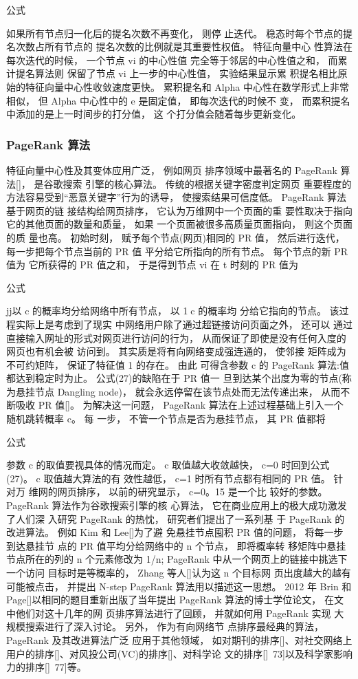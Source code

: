 				公式

				如果所有节点归一化后的提名次数不再变化， 则停 止迭代。 稳态时每个节点的提名次数占所有节点的 提名次数的比例就是其重要性权值。 特征向量中心 性算法在每次迭代的时候， 一个节点 vi 的中心性值 完全等于邻居的中心性值之和， 而累计提名算法则 保留了节点 vi 上一步的中心性值， 实验结果显示累 积提名相比原始的特征向量中心性收敛速度更快。 累积提名和 Alpha 中心性在数学形式上非常相似， 但 Alpha 中心性中的 e 是固定值， 即每次迭代的时候不 变， 而累积提名中添加的是上一时间步的打分值， 这 个打分值会随着每步更新变化。
	\subsubsection{PageRank 算法}
	特征向量中心性及其变体应用广泛， 例如网页 排序领域中最著名的 PageRank 算法[]， 是谷歌搜索 引擎的核心算法。 传统的根据关键字密度判定网页 重要程度的方法容易受到“恶意关键字”行为的诱导， 使搜索结果可信度低。 PageRank 算法基于网页的链 接结构给网页排序， 它认为万维网中一个页面的重 要性取决于指向它的其他页面的数量和质量， 如果 一个页面被很多高质量页面指向， 则这个页面的质 量也高。 初始时刻， 赋予每个节点(网页)相同的 PR 值， 然后进行迭代， 每一步把每个节点当前的 PR 值 平分给它所指向的所有节点。 每个节点的新 PR 值为 它所获得的 PR 值之和， 于是得到节点 vi 在 t 时刻的 PR 值为

				公式

				jj以 c 的概率均分给网络中所有节点， 以 1c 的概率均 分给它指向的节点。 该过程实际上是考虑到了现实 中网络用户除了通过超链接访问页面之外， 还可以 通过直接输入网址的形式对网页进行访问的行为， 从而保证了即使是没有任何入度的网页也有机会被 访问到。 其实质是将有向网络变成强连通的， 使邻接 矩阵成为不可约矩阵， 保证了特征值 1 的存在。 由此 可得含参数 c 的 PageRank 算法:值都达到稳定时为止。 公式(27)的缺陷在于 PR 值一 旦到达某个出度为零的节点(称为悬挂节点 Dangling node)， 就会永远停留在该节点处而无法传递出来， 从而不断吸收 PR 值[]。 为解决这一问题， PageRank 算法在上述过程基础上引入一个随机跳转概率 c。 每 一步， 不管一个节点是否为悬挂节点， 其 PR 值都将

				公式 

				参数 c 的取值要视具体的情况而定。 c 取值越大收敛越快， c=0 时回到公式(27)。 c 取值越大算法的有 效性越低， c=1 时所有节点都有相同的 PR 值。 针对万 维网的网页排序， 以前的研究显示， c=0。15 是一个比 较好的参数。 PageRank 算法作为谷歌搜索引擎的核 心算法， 它在商业应用上的极大成功激发了人们深 入研究 PageRank 的热忱， 研究者们提出了一系列基 于 PageRank 的改进算法。 例如 Kim 和 Lee[]为了避 免悬挂节点囤积 PR 值的问题， 将每一步到达悬挂节 点的 PR 值平均分给网络中的 n 个节点， 即将概率转 移矩阵中悬挂节点所在的列的 n 个元素修改为 1/n; PageRank 中从一个网页上的链接中挑选下一个访问 目标时是等概率的， Zhang 等人[]认为这 n 个目标网 页出度越大的越有可能被点击， 并提出 N-step PageRank 算法用以描述这一思想。 2012 年 Brin 和 Page[]以相同的题目重新出版了当年提出 PageRank 算法的博士学位论文， 在文中他们对这十几年的网 页排序算法进行了回顾， 并就如何用 PageRank 实现 大规模搜索进行了深入讨论。 另外， 作为有向网络节 点排序最经典的算法， PageRank 及其改进算法广泛 应用于其他领域， 如对期刊的排序[]、对社交网络上 用户的排序[]、对风投公司(VC)的排序[]、对科学论 文的排序[]~73]以及科学家影响力的排序[]~77]等。
